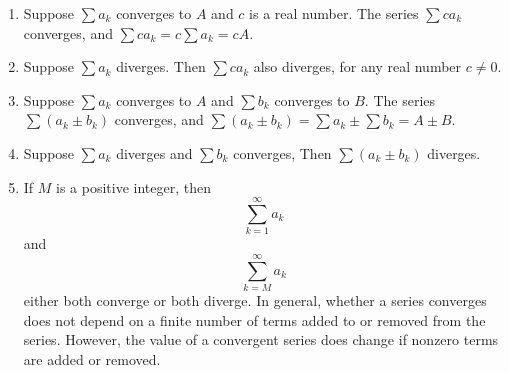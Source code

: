 \documentclass[compacto,10pt,comentarios]{aleph-notas}
\begin{document}
\begin{teo}
    \begin{enumerate}
        \item Suppose $\sum a_k$ converges to $A$ and $c$ is a real number. The series $\sum c a_k$ converges, and $\sum c a_k = c \sum a_k = c A$. 
        \item Suppose $\sum a_k$ diverges. Then $\sum c a_k$ also diverges, for any real number $c \neq 0$.
        \item Suppose $\sum a_k$ converges to $A$ and $\sum b_k$ converges to $B$. The series $\sum (a_k \pm b_k)$ converges, and $\sum(a_k \pm b_k) = \sum a_k \pm \sum b_k = A \pm B$.
        \item Suppose $\sum a_k$ diverges and $\sum b_k$ converges, Then $\sum (a_k \pm b_k)$ diverges.
        \item If $M$ is a positive integer, then
        $$
            \sum_{k=1}^{\infty} a_k
        $$
        and
        $$
            \sum_{k=M}^{\infty} a_k
        $$
        either both converge or both diverge. In general, whether a series converges does not depend on a finite number of terms added to or removed from the series. However, the value of a convergent series does change if nonzero terms are added or removed.
    \end{enumerate}
\end{teo}
\end{document}
